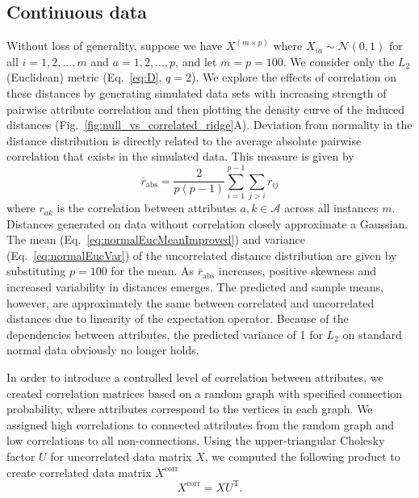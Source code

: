 \documentclass[10pt,letterpaper]{article}
\begin{document}
\subsection{Continuous data}

Without loss of generality, suppose we have $X^{(m \times p)}$ where $X_{ia} \sim \mathcal{N}(0,1)$ for all $i=1,2,\dots,m$ and $a=1,2,\dots,p$, and let $m=p=100$. We consider only the $L_2$ (Euclidean) metric (Eq.~\ref{eq:D}, $q=2$). We explore the effects of correlation on these distances by generating simulated data sets with increasing strength of pairwise attribute correlation and then plotting the density curve of the induced distances (Fig.~\ref{fig:null_vs_correlated_ridge}A). Deviation from normality in the distance distribution is directly related to the average absolute pairwise correlation that exists in the simulated data. This measure is given by
%
\begin{equation}\label{eq:abs_corr}
\bar{r}_\text{abs} = \frac{2}{p(p-1)}\sum^{p-1}_{i=1} \sum_{j > i} r_{ij}
\end{equation}
%
where $r_{ak}$ is the correlation between attributes $a,k \in \mathcal{A}$ across all instances $m$. Distances generated on data without correlation closely approximate a Gaussian. The mean (Eq.~\ref{eq:normalEucMeanImproved}) and variance (Eq.~\ref{eq:normalEucVar}) of the uncorrelated distance distribution are given by substituting $p=100$ for the mean. As $\bar{r}_\text{abs}$ increases, positive skewness and increased variability in distances emerges. The predicted and sample means, however, are approximately the same between correlated and uncorrelated distances due to linearity of the expectation operator. Because of the dependencies between attributes, the predicted variance of 1 for $L_2$ on standard normal data obviously no longer holds. 

In order to introduce a controlled level of correlation between attributes, we created correlation matrices based on a random graph with specified connection probability, where attributes correspond to the vertices in each graph. We assigned high correlations to connected attributes from the random graph and low correlations to all non-connections. Using the upper-triangular Cholesky factor $U$ for uncorrelated data matrix $X$, we computed the following product to create correlated data matrix $X^\text{corr}$
%
\begin{equation}\label{eq:cholesky}
X^\text{corr} = X U^\text{T}.
\end{equation}
\end{document}
